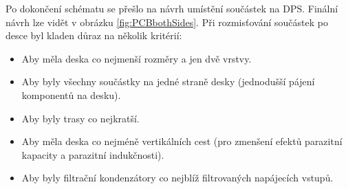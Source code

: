Po dokončení schématu se přešlo na návrh umístění součástek na DPS. Finální návrh lze vidět v obrázku \ref{fig:PCBbothSides}. Při rozmisťování součástek po desce byl kladen důraz na několik kritérií:
\begin{itemize}
	\item Aby měla deska co nejmenší rozměry a jen dvě vrstvy.
	\item Aby byly všechny součástky na jedné straně desky (jednodušší pájení komponentů na desku).
	\item Aby byly trasy co nejkratší.
	\item Aby měla deska co nejméně vertikálních cest (pro zmenšení efektů parazitní kapacity a parazitní indukčnosti).
	\item Aby byly filtrační kondenzátory co nejblíž filtrovaných napájecích vstupů.
\end{itemize}

